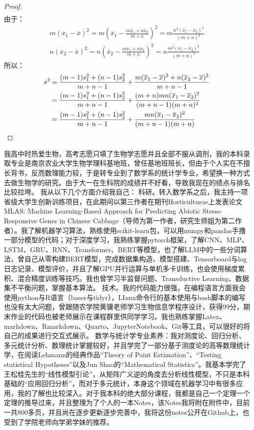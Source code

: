 \begin{proof}
\begin{align*}
	\end{align*}
	由于：
	\begin{gather*}
		m(\overline{x}_1-\overline{x})^2=m\left(\overline{x}_1-\frac{m\overline{x}_1+n\overline{x}_2}{m+n}\right)^2=m\frac{n^2(\overline{x}_1-\overline{x}_2)^2}{(m+n)^2} \\
		n(\overline{x}_2-\overline{x})^2=n\left(\overline{x}_2-\frac{m\overline{x}_1+n\overline{x}_2}{m+n}\right)^2=n\frac{m^2(\overline{x}_1-\overline{x}_2)^2}{(m+n)^2}
	\end{gather*}
	所以：
	\begin{align*}
		s^2&=\frac{(m-1)s_1^2+(n-1)s_2^2}{m+n-1}+\frac{m(\overline{x}_1-\overline{x})^2+n(\overline{x}_2-\overline{x})^2}{m+n-1} \\
		&=\frac{(m-1)s_1^2+(n-1)s_2^2}{m+n-1}+\frac{(m+n)mn(\overline{x}_1-\overline{x}_2)^2}{(m+n-1)(m+n)^2} \\
		&=\frac{(m-1)s_1^2+(n-1)s_2^2}{m+n-1}+\frac{mn(\overline{x}_1-\overline{x}_2)^2}{(m+n-1)(m+n)}\qedhere
	\end{align*}
\end{proof}
我高中时热爱生物，高考志愿只填了生物学志愿并且全部不服从调剂，我的本科录取专业是南京农业大学生物学理科基地班，曾任基地班班长，但由于个人实在不擅长背书，反而数理能力较，于是转专业到了数学系的统计学专业，希望换一种方式去做生物学的研究。由于大一在生科院的成绩并不好看，导致我现在的绩点与排名比较拉垮。
我从以下几个方面介绍我自己：
科研。转入数学系之后，我主持一项省级大学生创新训练项目，在此期间以第三作者在期刊Horticulturae上发表论文MLAS: Machine Learning-Based Approach for Predicting Abiotic Stress-Responsive Genes in Chinese Cabbage（导师为第一作者，研究生师姐为第二作者）。我了解机器学习算法，熟练使用scikit-learn包，可以用numpy和pandas手撸一部分模型的代码；对于深度学习，我熟练掌握pytorch框架，了解CNN、MLP、LSTM、GRU、RNN、Transformer、BERT等模型，也了解LLM中的一些分词算法，曾自己从零构建BERT模型，完成数据集构造、模型搭建、Tensorboard与log日志记录、模型评价，并且了解GPU并行运算与单机多卡训练，也会使用梯度累积、混合精度训练等技巧。我也曾学习半监督问题、Transductive Learning、数据集不平衡问题，掌握基本算法。
技术。我的代码能力很强，在编程语言方面我会使用python与R语言（baser与tidyr），LInux命令行的基本使用与bash脚本的编写也没有太大问题，曾跟随农学院黄骥老师学习生物信息学程序设计，获得99分，期末作业的代码也被老师展示在课程群里供同学学习。我也熟练掌握Latex、markdown、Rmarkdown、Quarto、JupyterNotebook、Git等工具，可以很好的将自己的成果进行交互式展示。
数学与统计学专业素养：我对测度论、回归分析、多元统计分析、数理统计掌握较好，并且学完了一部分基于测度论的高等数理统计学，在阅读Lehmann的经典作品“Theory of Point Estimation”、“Testing statistical Hypotheses”以及Jun Shao的“Mathematical Statistics”。我基本学完了王松桂先生的“线性模型引论”，从矩阵广义逆的角度去分析线性模型，不只是本科基础的“应用回归分析”，而对于多元统计，本身这个领域在机器学习中有很多应用，我的了解也比较深入。对于我本科的绝大部分课程，我都是自己一个定理一个定理的推导过来，并且整理为了个人的一本Notes，该Notes我将附在附件中，目前一共800多页，并且尚在逐步更新逐步完善中，我将这份notes公开在Github上，也受到了学院老师向学弟学妹的推荐。
